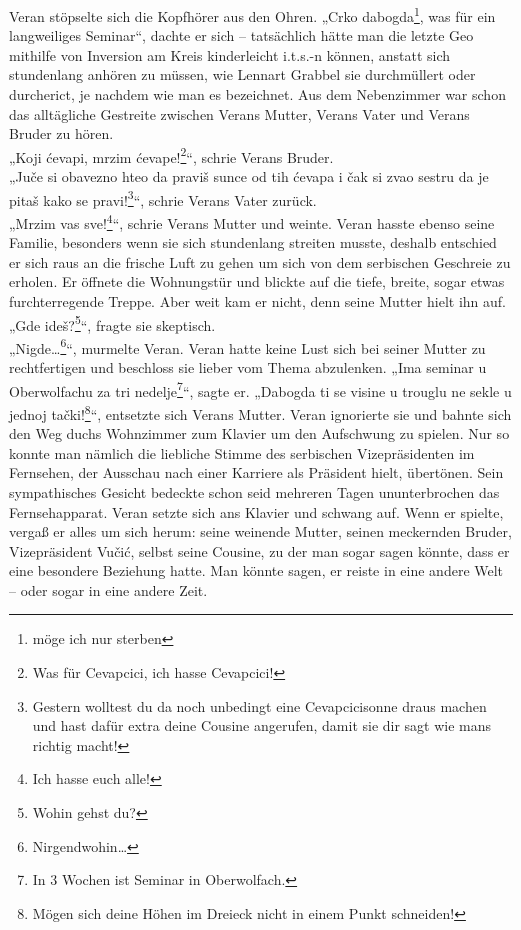 \documentclass[oneside]{memoir}
\begin{document}
Veran stöpselte sich die Kopfhörer aus den Ohren. „Crko dabogda\footnote{möge ich nur sterben}, was für ein langweiliges Seminar“, dachte er sich -- tatsächlich hätte man die letzte Geo mithilfe von Inversion am Kreis kinderleicht i.t.s.-n können, anstatt sich stundenlang anhören zu müssen, wie Lennart Grabbel sie durchmüllert oder durcherict, je nachdem wie man es bezeichnet. Aus dem Nebenzimmer war schon das alltägliche Gestreite zwischen Verans Mutter, Verans Vater und Verans Bruder zu hören. \\
„Koji ćevapi, mrzim ćevape!\footnote{Was für Cevapcici, ich hasse Cevapcici!}“, schrie Verans Bruder. \\
„Juče si obavezno hteo da praviš sunce od tih ćevapa i čak si zvao sestru da je pitaš kako se pravi!\footnote{Gestern wolltest du da noch unbedingt eine Cevapcicisonne draus machen und hast dafür extra deine Cousine angerufen, damit sie dir sagt wie mans richtig macht!}“, schrie Verans Vater zurück. \\
„Mrzim vas sve!\footnote{Ich hasse euch alle!}“, schrie Verans Mutter und weinte. Veran hasste ebenso seine Familie, besonders wenn sie sich stundenlang streiten musste, deshalb entschied er sich raus an die frische Luft zu gehen um sich von dem serbischen Geschreie zu erholen. Er öffnete die Wohnungstür und blickte auf die tiefe, breite, sogar etwas furchterregende Treppe. Aber weit kam er nicht, denn seine Mutter hielt ihn auf. \\
„Gde ideš?\footnote{Wohin gehst du?}“, fragte sie skeptisch. \\
„Nigde\ldots\footnote{Nirgendwohin\ldots}“, murmelte Veran. Veran hatte keine Lust sich bei seiner Mutter zu rechtfertigen und beschloss sie lieber vom Thema abzulenken. „Ima seminar u Oberwolfachu za tri nedelje\footnote{In 3 Wochen ist Seminar in Oberwolfach.}“, sagte er. „Dabogda ti se visine u trouglu ne sekle u jednoj tački!\footnote{Mögen sich deine Höhen im Dreieck nicht in einem Punkt schneiden!}“, entsetzte sich Verans Mutter. Veran ignorierte sie und bahnte sich den Weg duchs Wohnzimmer zum Klavier um den Aufschwung zu spielen. Nur so konnte man nämlich die liebliche Stimme des serbischen Vizepräsidenten im Fernsehen, der Ausschau nach einer Karriere als Präsident hielt, übertönen. Sein sympathisches Gesicht bedeckte schon seid mehreren Tagen ununterbrochen das Fernsehapparat. Veran setzte sich ans Klavier und schwang auf. Wenn er spielte, vergaß er alles um sich herum: seine weinende Mutter, seinen meckernden Bruder, Vizepräsident Vučić, selbst seine Cousine, zu der man sogar sagen könnte, dass er eine besondere Beziehung hatte. Man könnte sagen, er reiste in eine andere Welt -- oder sogar in eine andere Zeit.
\end{document}
